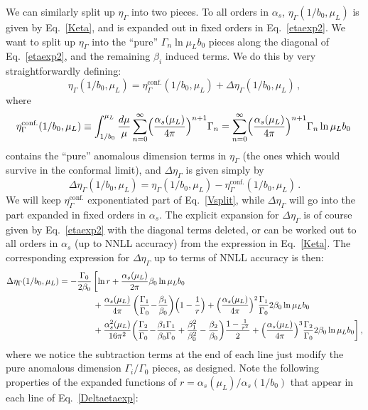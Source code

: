 \documentclass[a4,letterpaper,11pt]{article}
\newcommand{\nn}{\nonumber}
\newcommand{\be}{\begin{equation}}
\newcommand{\ee}{\end{equation}}
\newcommand{\minus}{\!-\!}
\newcommand{\as}{\alpha_s}
\newcommand{\eq}[1]{Eq.~\eqref{#1}}
\begin{document}
We can similarly split up $\eta_\Gamma$ into two pieces. To all orders in $\as$, $\eta_\Gamma(1/b_0,\mu_L)$ is given by \eq{Keta}, and is expanded out in fixed orders in \eq{etaexp2}. We want to split up $\eta_\Gamma$ into the ``pure'' $\Gamma_n \ln\mu_L b_0$ pieces along the diagonal of \eq{etaexp2}, and the remaining $\beta_i$ induced terms. We do this by very straightforwardly defining:
\be
\label{etasplit}
\eta_\Gamma(1/b_0,\mu_L) = \eta_\Gamma^{\text{conf.}}(1/b_0,\mu_L) + \Delta\eta_\Gamma(1/b_0,\mu_L)\,,
\ee
where
\be
\eta_\Gamma^{\text{conf.}}(1/b_0,\mu_L) \equiv \int_{1/b_0}^{\mu_L} \frac{d\mu}{\mu} \sum_{n=0}^\infty \Bigl(\frac{\as(\mu_L)}{4\pi}\Bigr)^{n+1}\Gamma_n = \sum_{n=0}^\infty \Bigl(\frac{\as(\mu_L)}{4\pi}\Bigr)^{n+1}\Gamma_n \ln\mu_L b_0\,
\ee
contains the ``pure'' anomalous dimension terms in $\eta_\Gamma$ (the ones which would survive in the conformal limit), and $\Delta\eta_\Gamma$ is given simply by
\be
\Delta\eta_\Gamma(1/b_0,\mu_L) = \eta_\Gamma(1/b_0,\mu_L) - \eta_\Gamma^{\text{conf.}}(1/b_0,\mu_L)\,.
\ee
We will keep $\eta_\Gamma^{\text{conf.}}$ exponentiated part of \eq{Vsplit}, while $\Delta\eta_\Gamma$ will go into the part expanded in fixed orders in $\as$. The explicit expansion for $\Delta\eta_\Gamma$ is of course given by \eq{etaexp2} with the diagonal terms deleted, or can be worked out to all orders in $\as$ (up to NNLL accuracy) from the expression in \eq{Keta}. The corresponding expression for $\Delta\eta_\Gamma$ up to terms of NNLL accuracy is then:
\begin{align}
\label{Deltaetaexp}
\Delta\eta_\Gamma(1/b_0, \mu_L) &=
 - \frac{\Gamma_0}{2\beta_0}\, \biggl[ \ln r + \frac{\as(\mu_L)}{2\pi} \beta_0 \ln \mu_L b_0 \\ 
 &\qquad\qquad + \frac{\as(\mu_L)}{4\pi}\, \biggl(\frac{\Gamma_1 }{\Gamma_0 }
 \minus \frac{\beta_1}{\beta_0}\biggr)\Bigl(1- \frac{1}{r}\Bigr) + \Bigl(\frac{\as(\mu_L)}{4\pi}\Bigr)^2 \frac{\Gamma_1}{\Gamma_0}2\beta_0\ln \mu_L b_0 \nn \\
 &\qquad \qquad + \frac{\as^2(\mu_L)}{16\pi^2} \biggl(
    \frac{\Gamma_2 }{\Gamma_0 } \minus \frac{\beta_1\Gamma_1 }{\beta_0 \Gamma_0 }
      + \frac{\beta_1^2}{\beta_0^2} -\frac{\beta_2}{\beta_0} \biggr) \frac{1 - \frac{1}{r^2}}{2} + \Bigl(\frac{\as(\mu_L)}{4\pi}\Bigr)^3 \frac{\Gamma_2}{\Gamma_0}2\beta_0\ln \mu_L b_0     \biggr] \,, \nn 
\end{align}
where we notice the subtraction terms at the end of each line just modify the pure anomalous dimension $\Gamma_i/\Gamma_0$ pieces, as designed. Note the following properties of the expanded functions of $r = \as(\mu_L)/\as(1/b_0)$ that appear in each line of \eq{Deltaetaexp}:
\end{document}
